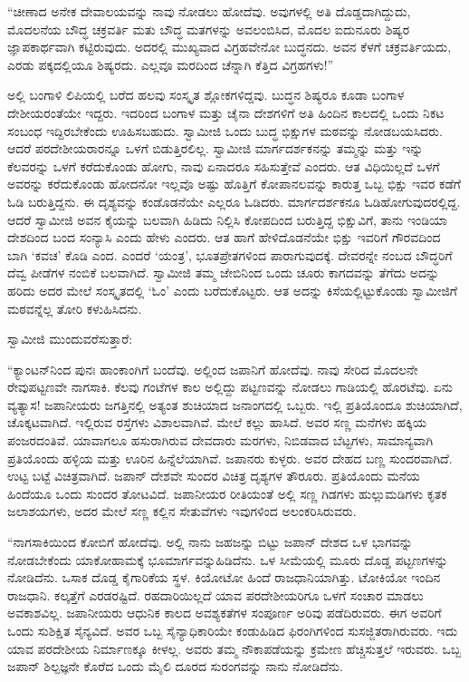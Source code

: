 “ಚೀಣಾದ ಅನೇಕ ದೇವಾಲಯವನ್ನು ನಾವು ನೋಡಲು ಹೋದೆವು. ಅವುಗಳಲ್ಲಿ ಅತಿ ದೊಡ್ಡದಾಗಿದ್ದುದು, ಮೊದಲನೆಯ ಬೌದ್ಧ ಚಕ್ರವರ್ತಿ ಮತು ಬೌದ್ಧ ಮತಗಳನ್ನು ಅವಲಂಬಿಸಿದ, ಮೊದಲ ಐದುನೂರು ಶಿಷ್ಯರ ಜ್ಞಾಪಕಾರ್ಥವಾಗಿ ಕಟ್ಟಿರುವುದು. ಅದರಲ್ಲಿ ಮುಖ್ಯವಾದ ವಿಗ್ರಹವೇನೋ ಬುದ್ಧನದು. ಅವನ ಕೆಳಗೆ ಚಕ್ರವರ್ತಿಯದು, ಎರಡು ಪಕ್ಕದಲ್ಲಿಯೂ ಶಿಷ್ಯರದು. ಎಲ್ಲವೂ ಮರದಿಂದ ಚೆನ್ನಾಗಿ ಕೆತ್ತಿದ ವಿಗ್ರಹಗಳು!” 

 ಅಲ್ಲಿ ಬಂಗಾಳಿ ಲಿಪಿಯಲ್ಲಿ ಬರೆದ ಹಲವು ಸಂಸ್ಕೃತ ಶ್ಲೋಕಗಳಿದ್ದವು. ಬುದ್ಧನ ಶಿಷ್ಯರೂ ಕೂಡಾ ಬಂಗಾಳ ದೇಶೀಯರಂತೆಯೇ ಇದ್ದರು. ಇದರಿಂದ ಬಂಗಾಳ ಮತ್ತು ಚೈನಾ ದೇಶಗಳಿಗೆ ಅತಿ ಹಿಂದಿನ ಕಾಲದಲ್ಲಿ ಒಂದು ನಿಕಟ ಸಂಬಂಧ ಇದ್ದಿರಬೇಕೆಂದು ಊಹಿಸಬಹುದು. ಸ್ವಾಮೀಜಿ ಒಂದು ಬುದ್ಧ ಭಿಕ್ಷುಗಳ ಮಠವನ್ನು ನೋಡಬಯಸಿದರು. ಆದರೆ ಪರದೇಶೀಯರಾರನ್ನೂ ಒಳಗೆ ಬಿಡುತ್ತಿರಲಿಲ್ಲ. ಸ್ವಾಮೀಜಿ ಮಾರ್ಗದರ್ಶಕನನ್ನು ತಮ್ಮನ್ನು ಮತ್ತು ಇನ್ನು ಕೆಲವರನ್ನು ಒಳಗೆ ಕರೆದುಕೊಂಡು ಹೋಗು, ನಾವು ಏನಾದರೂ ಸಹಿಸುತ್ತೇವೆ ಎಂದರು. ಆತ ವಿಧಿಯಿಲ್ಲದೆ ಒಳಗೆ ಅವರನ್ನು ಕರೆದುಕೊಂಡು ಹೋದನೋ ಇಲ್ಲವೊ ಅಷ್ಟು ಹೊತ್ತಿಗೆ ಕೋಪಾನಲವನ್ನು ಕಾರುತ್ತ ಒಬ್ಬ ಭಿಕ್ಷು ಇವರ ಕಡೆಗೆ ಓಡಿ ಬರುತ್ತಿದ್ದನು. ಈ ದೃಶ್ಯವನ್ನು ಕಂಡೊಡನೆಯೇ ಎಲ್ಲರೂ ಓಡಿದರು. ಮಾರ್ಗದರ್ಶಕನೂ ಓಡಿಹೋಗುವುದರಲ್ಲಿದ್ದ. ಆದರೆ ಸ್ವಾಮೀಜಿ ಅವನ ಕೈಯನ್ನು ಬಲವಾಗಿ ಹಿಡಿದು ನಿಲ್ಲಿಸಿ ಕೋಪದಿಂದ ಬರುತ್ತಿದ್ದ ಭಿಕ್ಷುವಿಗೆ, ತಾನು ಇಂಡಿಯಾ ದೇಶದಿಂದ ಬಂದ ಸಂನ್ಯಾಸಿ ಎಂದು ಹೇಳು ಎಂದರು. ಆತ ಹಾಗೆ ಹೇಳಿದೊಡನೆಯೇ ಭಿಕ್ಷು ಇವರಿಗೆ ಗೌರವದಿಂದ ಬಾಗಿ ‘ಕವಚ’ ಕೊಡಿ ಎಂದ. ಎಂದರೆ ‘ಯಂತ್ರ’, ಭೂತಪ್ರೇತಗಳಿಂದ ಪಾರಾಗುವುದಕ್ಕೆ. ದೇವರನ್ನೇ ನಂಬದ ಬೌದ್ಧರಿಗೆ ದೆವ್ವ ಪೀಡೆಗಳ ನಂಬಿಕೆ ಬಲವಾಗಿದೆ. ಸ್ವಾಮೀಜಿ ತಮ್ಮ ಜೇಬಿನಿಂದ ಒಂದು ಚೂರು ಕಾಗದವನ್ನು ತೆಗೆದು ಅದನ್ನು ಹರಿದು ಅದರ ಮೇಲೆ ಸಂಸ್ಕೃತದಲ್ಲಿ ‘ಓಂ’ ಎಂದು ಬರೆದುಕೊಟ್ಟರು. ಆತ ಅದನ್ನು ಕಿಸೆಯಲ್ಲಿಟ್ಟುಕೊಂಡು ಸ್ವಾಮೀಜಿಗೆ ಮಠವನ್ನೆಲ್ಲ ತೋರಿ ಕಳುಹಿಸಿದನು. 

 ಸ್ವಾಮೀಜಿ ಮುಂದುವರೆಸುತ್ತಾರೆ:

 “ಕ್ಯಾಂಟನ್‍ನಿಂದ ಪುನಃ ಹಾಂಕಾಂಗಿಗೆ ಬಂದೆವು. ಅಲ್ಲಿಂದ ಜಪಾನಿಗೆ ಹೋದೆವು. ನಾವು ಸೇರಿದ ಮೊದಲನೇ ರೇವುಪಟ್ಟಣವೇ ನಾಗಸಾಕಿ. ಕೆಲವು ಗಂಟೆಗಳ ಕಾಲ ಅಲ್ಲಿದ್ದು ಪಟ್ಟಣವನ್ನು ನೋಡಲು ಗಾಡಿಯಲ್ಲಿ ಹೊರಟೆವು. ಏನು ವ್ಯತ್ಯಾಸ! ಜಪಾನೀಯರು ಜಗತ್ತಿನಲ್ಲಿ ಅತ್ಯಂತ ಶುಚಿಯಾದ ಜನಾಂಗದಲ್ಲಿ ಒಬ್ಬರು. ಇಲ್ಲಿ ಪ್ರತಿಯೊಂದೂ ಶುಚಿಯಾಗಿದೆ, ಚೊಕ್ಕಟವಾಗಿದೆ. ಇಲ್ಲಿರುವ ರಸ್ತೆಗಳು ವಿಶಾಲವಾಗಿವೆ. ಮೇಲೆ ಕಲ್ಲು ಹಾಸಿದೆ. ಅವರ ಸಣ್ಣ ಮನೆಗಳು ಹಕ್ಕಿಯ ಪಂಜರದಂತಿವೆ. ಯಾವಾಗಲೂ ಹಸುರಾಗಿರುವ ದೇವದಾರು ಮರಗಳು, ನಿಬಿಡವಾದ ಬೆಟ್ಟಗಳು, ಸಾಮಾನ್ಯವಾಗಿ ಪ್ರತಿಯೊಂದು ಹಳ್ಳಿಯ ಮತ್ತು ಊರಿನ ಹಿನ್ನೆಲೆಯಾಗಿವೆ. ಜಪಾನರು ಕುಳ್ಳರು. ಅವರ ದೇಹದ ಬಣ್ಣ ಸುಂದರವಾಗಿದೆ. ಉಟ್ಟ ಬಟ್ಟೆ ವಿಚಿತ್ರವಾಗಿದೆ. ಜಪಾನ್ ದೇಶವೇ ಸುಂದರ ವಿಚಿತ್ರ ದೃಶ್ಯಗಳ ತೌರೂರು. ಪ್ರತಿಯೊಂದು ಮನೆಯ ಹಿಂದೆಯೂ ಒಂದು ಸುಂದರ ತೋಟವಿದೆ. ಜಪಾನೀಯರ ರೀತಿಯಂತೆ ಅಲ್ಲಿ ಸಣ್ಣ ಗಿಡಗಳು ಹುಲ್ಲುಮಡಿಗಳು ಕೃತಕ ಜಲಾಶಯಗಳು, ಅದರ ಮೇಲೆ ಸಣ್ಣ ಕಲ್ಲಿನ ಸೇತುವೆಗಳು ಇವುಗಳಿಂದ ಅಲಂಕರಿಸಿರುವರು.

 “ನಾಗಸಾಕಿಯಿಂದ ಕೋಬಿಗೆ ಹೋದೆವು. ಅಲ್ಲಿ ನಾನು ಜಹಜನ್ನು ಬಿಟ್ಟು ಜಪಾನ್ ದೇಶದ ಒಳ ಭಾಗವನ್ನು ನೋಡಬೇಕೆಂದು ಯಾಕೋಹಾಮಕ್ಕೆ ಭೂಮಾರ್ಗವನ್ನು\break ಹಿಡಿದೆನು. ಒಳ ಸೀಮೆಯಲ್ಲಿ ಮೂರು ದೊಡ್ಡ ಪಟ್ಟಣಗಳನ್ನು ನೋಡಿದೆನು. ಒಸಾಕ ದೊಡ್ಡ ಕೈಗಾರಿಕೆಯ ಸ್ಥಳ. ಕಿಯೋಟೋ ಹಿಂದೆ ರಾಜಧಾನಿಯಾಗಿತ್ತು. ಟೋಕಿಯೋ ಇಂದಿನ ರಾಜಧಾನಿ. ಕಲ್ಕತ್ತೆಗೆ ಎರಡರಷ್ಟಿದೆ. ರಹದಾರಿಯಿಲ್ಲದೆ ಯಾವ ಪರದೇಶೀಯರಿಗೂ ಒಳಗೆ ಸಂಚಾರ ಮಾಡಲು ಅವಕಾಶವಿಲ್ಲ. ಜಪಾನೀಯರು ಆಧುನಿಕ ಕಾಲದ ಅವಶ್ಯಕತೆಗಳ ಸಂಪೂರ್ಣ ಅರಿವು ಪಡೆದಿರುವರು. ಈಗ ಅವರಿಗೆ ಒಂದು ಸುಶಿಕ್ಷಿತ ಸೈನ್ಯವಿದೆ. ಅವರ ಒಬ್ಬ ಸೈನ್ಯಾಧಿಕಾರಿಯೇ ಕಂಡುಹಿಡಿದ ಫಿರಂಗಿಗಳಿಂದ ಸುಸಜ್ಜಿತರಾಗಿರುವರು. ಇದು ಯಾವ ಪರದೇಶೀಯ ನಿರ್ಮಾಣಕ್ಕೂ ಕೀಳಲ್ಲ. ಅವರು ತಮ್ಮ ನೌಕಾಪಡೆಯನ್ನು ಕ್ರಮೇಣ ಹೆಚ್ಚಿಸುತ್ತಲೆ ಇರುವರು. ಒಬ್ಬ ಜಪಾನ್ ಶಿಲ್ಪಜ್ಞನೇ ಕೊರೆದ ಒಂದು ಮೈಲಿ ದೂರದ ಸುರಂಗವನ್ನು ನಾನು ನೋಡಿದೆನು.

